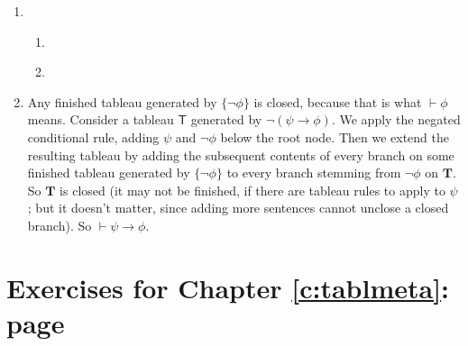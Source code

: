 {\begin{enumerate}
\begin{enumerate}
{	   
	      \qobitree 
	}
\end{enumerate}
\item \begin{enumerate}
	\item ~ {
	     
	     \qobitree
	}
	\item ~ {
	    \qobitree
	}

\end{enumerate}
 \setcounter{enumi}{5}
\item Any finished tableau generated by $\{\neg\phi\}$ is closed, because that is what $\vdash\phi$ means. Consider a tableau $\mathsf{T}$ generated by $\neg(\psi\to\phi)$. We apply the negated conditional rule, adding $\psi$ and $\neg\phi$ below the root node. Then we extend the resulting tableau by adding the subsequent contents of every branch on some finished tableau generated by $\{\neg\phi\}$ to every branch stemming from $¬\phi$ on $\mathbf{T}$. So $\mathbf{T}$ is closed (it may not be finished, if there are tableau rules to apply to $\psi$; but it doesn't matter, since adding more sentences cannot unclose a closed branch). So $\vdash\psi\to\phi$.
\end{enumerate}

\section*{Exercises for Chapter \ref{c:tablmeta}: page \pageref{ex:tablmeta}} \label{ans:tablmeta}

}
